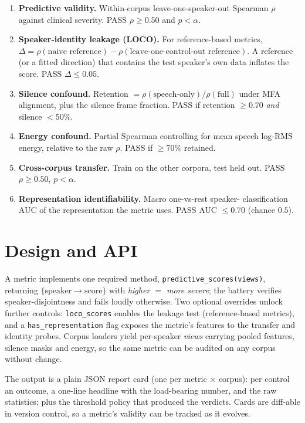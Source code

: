 \documentclass[conference]{IEEEtran}
\begin{document}
\begin{enumerate}\itemsep2pt
\item \textbf{Predictive validity.} Within-corpus leave-one-speaker-out Spearman
$\rho$ against clinical severity. PASS $\rho\ge0.50$ and $p<\alpha$.
\item \textbf{Speaker-identity leakage (LOCO).} For reference-based metrics,
$\Delta = \rho(\text{naive reference}) - \rho(\text{leave-one-control-out
reference})$. A reference (or a fitted direction) that contains the test speaker's
own data inflates the score. PASS $\Delta\le0.05$.
\item \textbf{Silence confound.} Retention $=\rho(\text{speech-only}) /
\rho(\text{full})$ under MFA~\cite{mcauliffe2017mfa} alignment, plus the silence
frame fraction. PASS if retention $\ge0.70$ \emph{and} silence $<50\%$.
\item \textbf{Energy confound.} Partial Spearman controlling for mean speech
log-RMS energy, relative to the raw $\rho$. PASS if $\ge70\%$ retained.
\item \textbf{Cross-corpus transfer.} Train on the other corpora, test held out.
PASS $\rho\ge0.50$, $p<\alpha$.
\item \textbf{Representation identifiability.} Macro one-vs-rest speaker-
classification AUC of the representation the metric uses. PASS AUC $\le0.70$
(chance $0.5$).
\end{enumerate}

\section{Design and API}
\label{sec:design}
A metric implements one required method, \texttt{predictive\_scores(views)},
returning $\{\text{speaker}\rightarrow\text{score}\}$ with \emph{higher $=$ more
severe}; the battery verifies speaker-disjointness and fails loudly otherwise.
Two optional overrides unlock further controls: \texttt{loco\_scores} enables the
leakage test (reference-based metrics), and a \texttt{has\_representation} flag
exposes the metric's features to the transfer and identity probes. Corpus loaders
yield per-speaker \emph{views} carrying pooled features, silence masks and energy,
so the same metric can be audited on any corpus without change.

The output is a plain JSON report card (one per metric $\times$ corpus): per
control an outcome, a one-line headline with the load-bearing number, and the raw
statistics; plus the threshold policy that produced the verdicts. Cards are
diff-able in version control, so a metric's validity can be tracked as it evolves.
\end{document}
